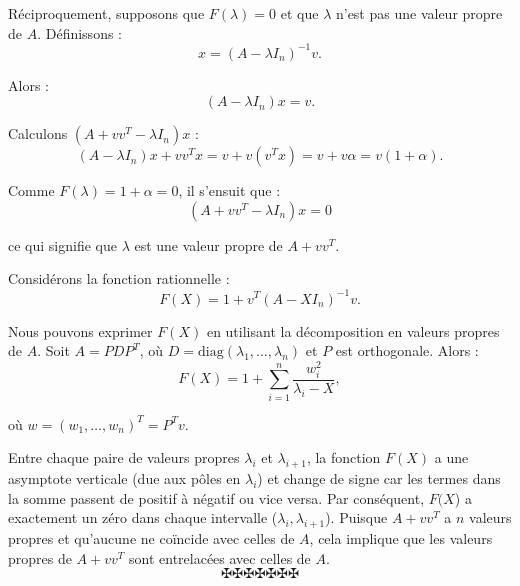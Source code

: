 R{\'e}ciproquement, supposons que $F (\lambda) = 0$ et que $\lambda$ n'est pas
une valeur propre de $A$. D{\'e}finissons :
\[ x = (A - \lambda I_n)^{- 1} v. \]


Alors :
\[ (A - \lambda I_n) x = v. \]


Calculons $(A + vv^T - \lambda I_n) x$ :
\[ (A - \lambda I_n) x + vv^T x = v + v (v^T x) = v + v \alpha = v (1 +
   \alpha) . \]


Comme $F (\lambda) = 1 + \alpha = 0$, il s'ensuit que :
\[ (A + vv^T - \lambda I_n) x = 0 \]


ce qui signifie que $\lambda$ est une valeur propre de $A + vv^T$.

Consid{\'e}rons la fonction rationnelle :
\[ F (X) = 1 + v^T (A - XI_n)^{- 1} v. \]


Nous pouvons exprimer $F (X)$ en utilisant la d{\'e}composition en valeurs
propres de $A$. Soit $A = PDP^T$, o{\`u} $D = \mathrm{diag} (\lambda_1,
\ldots, \lambda_n)$ et $P$ est orthogonale. Alors :
\[ F (X) = 1 + \sum_{i = 1}^n \frac{w_i^2}{\lambda_i - X}, \]


o{\`u} $w = (w_1, \ldots, w_n)^T = P^T v$.

Entre chaque paire de valeurs propres $\lambda_i$ et $\lambda_{i + 1}$, la
fonction $F (X)$ a une asymptote verticale (due aux p{\^o}les en $\lambda_i$)
et change de signe car les termes dans la somme passent de positif {\`a}
n{\'e}gatif ou vice versa. Par cons{\'e}quent, $F (X$) a exactement un
z{\'e}ro dans chaque intervalle ($\lambda_i, \lambda_{i + 1}$). Puisque $A +
vv^T$ a $n$ valeurs propres et qu'aucune ne co{\"i}ncide avec celles de $A$,
cela implique que les valeurs propres de $A + vv^T$ sont entrelac{\'e}es avec
celles de $A$.
\[ \maltese \maltese \maltese \maltese \maltese \maltese \maltese \]
